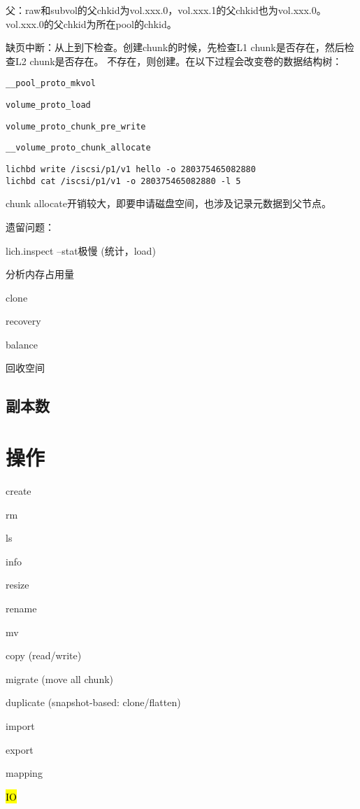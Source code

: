 父：raw和subvol的父chkid为vol.xxx.0，vol.xxx.1的父chkid也为vol.xxx.0。vol.xxx.0的父chkid为所在pool的chkid。

缺页中断：从上到下检查。创建chunk的时候，先检查L1 chunk是否存在，然后检查L2 chunk是否存在。
不存在，则创建。在以下过程会改变卷的数据结构树：
\begin{compactitem}
\item \verb|__pool_proto_mkvol|
\item \verb|volume_proto_load|
\item \verb|volume_proto_chunk_pre_write|
\item \verb|__volume_proto_chunk_allocate|
\end{compactitem}

\begin{lstlisting}[frame=single]
lichbd write /iscsi/p1/v1 hello -o 280375465082880
lichbd cat /iscsi/p1/v1 -o 280375465082880 -l 5
\end{lstlisting}

chunk allocate开销较大，即要申请磁盘空间，也涉及记录元数据到父节点。

遗留问题：
\begin{enumbox}
\item lich.inspect --stat极慢 (统计，load)
\item 分析内存占用量
\item clone
\item recovery
\item balance
\item 回收空间
\end{enumbox}

\subsection{副本数}

\section{操作}

\begin{enumbox}
\item create
\item rm
\item ls
\item info
\item resize
\item rename
\item mv
\item copy (read/write)
\item migrate (move all chunk)
\item duplicate (snapshot-based: clone/flatten)
\item import
\item export
\item mapping
\item \hl{IO}
\end{enumbox}

